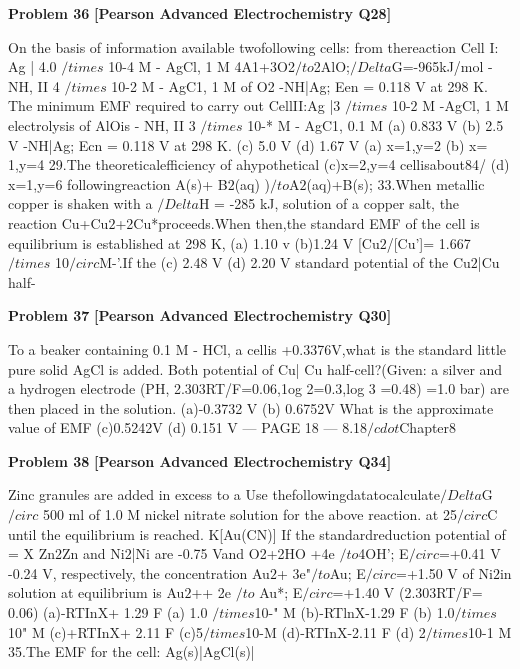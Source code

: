 \begin{problembox}
\textbf{Problem 36} \hfill \textbf{[Pearson Advanced Electrochemistry Q28]}
\label{q:ext-pearson-36}

On the basis of information available
twofollowing cells:
from thereaction
Cell I: Ag | 4.0 $/times$ 10-4 M - AgCl, 1 M
4A1+3O2$/to$2AlO;$/Delta$G=-965kJ/mol
- NH, II 4 $/times$ 10-2 M - AgC1, 1 M
of O2
-NH|Ag; Een = 0.118 V at 298 K.
The minimum EMF required to carry out
CellII:Ag |3 $/times$ 10-$2$ M -AgCl, 1 M
electrolysis of AlOis
- NH, II 3 $/times$ 10-* M - AgC1, 0.1 M
(a) 0.833 V
(b) 2.5 V
-NH|Ag; Ecn = 0.118 V at 298 K.
(c) 5.0 V
(d) 1.67 V
(a) x=1,y=2
(b) x= 1,y=4
29.The theoreticalefficiency of ahypothetical
(c)x=2,y=4
cellisabout84/%
(d) x=1,y=6
followingreaction
A(s)+ B$2$(aq)
)$/to$A$2$(aq)+B(s);
33.When metallic copper is shaken with a
$/Delta$H = -285 kJ,
solution of a copper salt, the reaction
Cu+Cu$2$+2Cu*proceeds.When
then,the standard EMF of the cell is
equilibrium is established at 298 K,
(a) 1.10 v
(b)1.24 V
[Cu$2$/[Cu']= 1.667 $/times$ 10$/circ$M-'.If the
(c) 2.48 V
(d) 2.20 V
standard potential of the Cu$2$|Cu half-
\end{problembox}

\begin{problembox}
\textbf{Problem 37} \hfill \textbf{[Pearson Advanced Electrochemistry Q30]}
\label{q:ext-pearson-37}

To a beaker containing 0.1 M - HCl, a
cellis +0.3376V,what is the standard
little pure solid AgCl is added. Both
potential of Cu| Cu half-cell?(Given:
a silver and a hydrogen electrode (PH,
2.303RT/F=0.06,1og 2=0.3,log 3 =0.48)
=1.0 bar) are then placed in the solution.
(a)-0.3732 V
(b) 0.6752V
What is the approximate value of EMF
(c)0.5242V
(d) 0.151 V
--- PAGE 18 ---
8.18$/cdot$Chapter8
\end{problembox}

\begin{problembox}
\textbf{Problem 38} \hfill \textbf{[Pearson Advanced Electrochemistry Q34]}
\label{q:ext-pearson-38}

Zinc granules are added in excess to a
Use thefollowingdatatocalculate$/Delta$G$/circ$
500 ml of 1.0 M nickel nitrate solution
for the above reaction.
at 25$/circ$C until the equilibrium is reached.
K[Au(CN)]
If the standardreduction potential of
= X
Zn$2$Zn and Ni$2$|Ni are -0.75 Vand
O2+2HO +4e $/to$4OH'; E$/circ$=+0.41 V
-0.24 V, respectively, the concentration
Au$2$+ 3e"$/to$Au;
E$/circ$=+1.50 V
of Ni$2$in solution at equilibrium is
Au$2$++ 2e $/to$ Au*;
E$/circ$=+1.40 V
(2.303RT/F= 0.06)
(a)-RTInX+ 1.29 F
(a) 1.0 $/times$10-" M
(b)-RTlnX-1.29 F
(b) 1.0$/times$10" M
(c)+RTInX+ 2.11 F
(c)5$/times$10-M
(d)-RTInX-2.11 F
(d) 2$/times$10-1 M
35.The EMF for the cell: Ag(s)|AgCl(s)|
\end{problembox}

